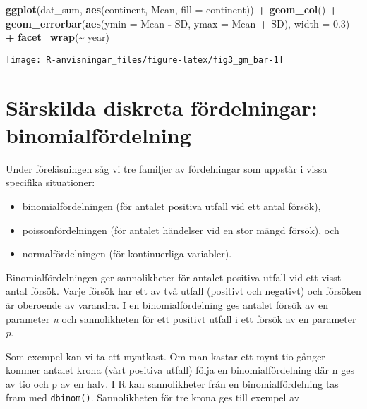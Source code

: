 \documentclass[
]{book}
\newenvironment{Shaded}{\begin{snugshade}}{\end{snugshade}}
\newcommand{\AttributeTok}[1]{\textcolor[rgb]{0.13,0.29,0.53}{#1}}
\newcommand{\FloatTok}[1]{\textcolor[rgb]{0.00,0.00,0.81}{#1}}
\newcommand{\FunctionTok}[1]{\textcolor[rgb]{0.13,0.29,0.53}{\textbf{#1}}}
\newcommand{\NormalTok}[1]{#1}
\newcommand{\SpecialCharTok}[1]{\textcolor[rgb]{0.81,0.36,0.00}{\textbf{#1}}}
\providecommand{\tightlist}{%
  \setlength{\itemsep}{0pt}\setlength{\parskip}{0pt}}
\theoremstyle{definition}
\theoremstyle{definition}
\theoremstyle{definition}
\theoremstyle{definition}
\theoremstyle{remark}
\begin{document}
\begin{Shaded}
\begin{Highlighting}[]
\FunctionTok{ggplot}\NormalTok{(dat\_sum, }\FunctionTok{aes}\NormalTok{(continent, Mean, }\AttributeTok{fill =}\NormalTok{ continent)) }\SpecialCharTok{+}
  \FunctionTok{geom\_col}\NormalTok{() }\SpecialCharTok{+}
  \FunctionTok{geom\_errorbar}\NormalTok{(}\FunctionTok{aes}\NormalTok{(}\AttributeTok{ymin =}\NormalTok{ Mean }\SpecialCharTok{{-}}\NormalTok{ SD, }\AttributeTok{ymax =}\NormalTok{ Mean }\SpecialCharTok{+}\NormalTok{ SD), }\AttributeTok{width =} \FloatTok{0.3}\NormalTok{) }\SpecialCharTok{+}
  \FunctionTok{facet\_wrap}\NormalTok{(}\SpecialCharTok{\textasciitilde{}}\NormalTok{ year)}
\end{Highlighting}
\end{Shaded}

\begin{center}\texttt{[image: R-anvisningar\_files/figure-latex/fig3\_gm\_bar-1]} \end{center}

\hypertarget{suxe4rskilda-diskreta-fuxf6rdelningar-binomialfuxf6rdelning}{%
\section{Särskilda diskreta fördelningar: binomialfördelning}\label{suxe4rskilda-diskreta-fuxf6rdelningar-binomialfuxf6rdelning}}

Under föreläsningen såg vi tre familjer av fördelningar som uppstår i vissa specifika situationer:

\begin{itemize}
\tightlist
\item
  binomialfördelningen (för antalet positiva utfall vid ett antal försök),
\item
  poissonfördelningen (för antalet händelser vid en stor mängd försök), och
\item
  normalfördelningen (för kontinuerliga variabler).
\end{itemize}

Binomialfördelningen ger sannolikheter för antalet positiva utfall vid ett visst antal försök. Varje försök har ett av två utfall (positivt och negativt) och försöken är oberoende av varandra. I en binomialfördelning ges antalet försök av en parameter \emph{n} och sannolikheten för ett positivt utfall i ett försök av en parameter \emph{p}.

Som exempel kan vi ta ett myntkast. Om man kastar ett mynt tio gånger kommer antalet krona (vårt positiva utfall) följa en binomialfördelning där n ges av tio och p av en halv. I R kan sannolikheter från en binomialfördelning tas fram med \texttt{dbinom()}. Sannolikheten för tre krona ges till exempel av
\end{document}

